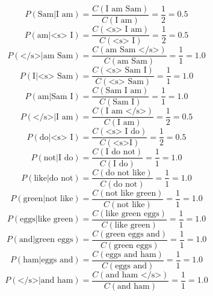 \documentclass[a4paper, 11pt]{article}
\begin{document}
\begin{multicols}{2}
	\noindent
	\begin{equation}
P(\text{Sam} | \text{I am}) = \frac{C(\text{I am Sam})}{C(\text{I am})} = \frac{1}{2} = 0.5
	\end{equation}
	\begin{equation}
P(\text{am} | \text{<s> I}) = \frac{C(\text{<s> I am})}{C(\text{<s> I})} = \frac{1}{2} = 0.5
	\end{equation}
	\begin{equation}
	P(\text{</s>} | \text{am Sam}) = \frac{C(\text{am Sam </s>})}{C(\text{am Sam})} = \frac{1}{1} = 1.0
	\end{equation}
	\begin{equation}
	P(\text{I} | \text{<s> Sam}) = \frac{C(\text{<s> Sam I})}{C(\text{<s> Sam})} = \frac{1}{1} = 1.0
\end{equation}
	\begin{equation}
	P(\text{am} | \text{Sam I}) = \frac{C(\text{Sam I am})}{C(\text{Sam I})} = \frac{1}{1} = 1.0
\end{equation}
	\begin{equation}
	P(\text{</s>} | \text{I am}) = \frac{C(\text{I am </s>})}{C(\text{I am})} = \frac{1}{2} = 0.5
\end{equation}
	\begin{equation}
	P(\text{do} | \text{<s> I}) = \frac{C(\text{<s> I do})}{C(\text{<s>I})} = \frac{1}{2} = 0.5
\end{equation}
	\begin{equation}
	P(\text{not} | \text{I do}) = \frac{C(\text{I do not})}{C(\text{I do})} = \frac{1}{1} = 1.0
\end{equation}
	\begin{equation}
	P(\text{like} | \text{do not}) = \frac{C(\text{do not like})}{C(\text{do not})} = \frac{1}{1} = 1.0
\end{equation}
	\begin{equation}
	P(\text{green} | \text{not like}) = \frac{C(\text{not like green})}{C(\text{not like})} = \frac{1}{1} = 1.0
\end{equation}
	\begin{equation}
	P(\text{eggs} | \text{like green}) = \frac{C(\text{like green eggs})}{C(\text{like green})} = \frac{1}{1} = 1.0
\end{equation}
	\begin{equation}
	P(\text{and} | \text{green eggs}) = \frac{C(\text{green eggs and})}{C(\text{green eggs})} = \frac{1}{1} = 1.0
\end{equation}
	\begin{equation}
	P(\text{ham} | \text{eggs and}) = \frac{C(\text{eggs and ham})}{C(\text{eggs and})} = \frac{1}{1} = 1.0
\end{equation}
	\begin{equation}
	P(\text{</s>} | \text{and ham}) = \frac{C(\text{and ham </s>})}{C(\text{and ham})} = \frac{1}{1} = 1.0
\end{equation}
\end{multicols}
\end{document}
